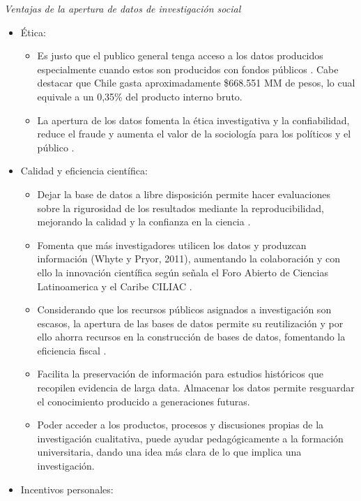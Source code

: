 \documentclass[
  14pt,
]{book}
\begin{document}
\emph{Ventajas de la apertura de datos de investigación social}

\begin{itemize}
\item
  Ética:

  \begin{itemize}
  \item
    Es justo que el publico general tenga acceso a los datos producidos especialmente cuando estos son producidos con fondos públicos \citep{bueno_What_2017}. Cabe destacar que Chile gasta aproximadamente \$668.551 MM de pesos, lo cual equivale a un 0,35\% del producto interno bruto.
  \item
    La apertura de los datos fomenta la ética investigativa y la confiabilidad, reduce el fraude y aumenta el valor de la sociología para los políticos y el público \citep{breznau_Future_2019}.
  \end{itemize}
\item
  Calidad y eficiencia científica:

  \begin{itemize}
  \item
    Dejar la base de datos a libre disposición permite hacer evaluaciones sobre la rigurosidad de los resultados mediante la reproducibilidad, mejorando la calidad y la confianza en la ciencia \citep{unesco_Que_2020}.
  \item
    Fomenta que más investigadores utilicen los datos y produzcan información (Whyte y Pryor, 2011), aumentando la colaboración y con ello la innovación científica según señala el Foro Abierto de Ciencias Latinoamerica y el Caribe CILIAC \citep{ramirez_Ciencia_2019}.
  \item
    Considerando que los recursos públicos asignados a investigación son escasos, la apertura de las bases de datos permite su reutilización y por ello ahorra recursos en la construcción de bases de datos, fomentando la eficiencia fiscal \citep{gomez_Datos_2016}.
  \item
    Facilita la preservación de información para estudios históricos que recopilen evidencia de larga data. Almacenar los datos permite resguardar el conocimiento producido a generaciones futuras.
  \item
    Poder acceder a los productos, procesos y discusiones propias de la investigación cualitativa, puede ayudar pedagógicamente a la formación universitaria, dando una idea más clara de lo que implica una investigación\citep{bishop_Revisiting_2017}.
  \end{itemize}
\item
  Incentivos personales:


\end{itemize}
\end{document}
